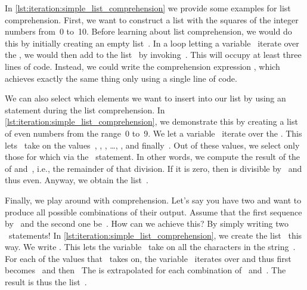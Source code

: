 %
In \cref{lst:iteration:simple_list_comprehension} we provide some examples for list comprehension.
First, we want to construct a list with the squares of the integer numbers from~0 to~10.
Before learning about list comprehension, we would do this by initially creating an empty list~.
In a  loop letting a variable~ iterate over the , we would then add  to the list~ by invoking~.
This will occupy at least three lines of code.
Instead, we could write the comprehension expression , which achieves exactly the same thing only using a single line of code.

We can also select which elements we want to insert into our list by using an  statement during the list comprehension.
In \cref{lst:iteration:simple_list_comprehension}, we demonstrate this by creating a list of even numbers from the range~0 to~9.
We let a variable~ iterate over the .
This lets~ take on the values~, , , \dots, , and finally~.
Out of these values, we select only those for which  via the ~statement.
In other words, we compute the result of the  of  and~, i.e., the remainder of that division.
If it is zero, then  is divisible by~ and thus even.
Anyway, we obtain the list~\pythonil{[0, 2, 4, 6, 8]}.%
%
\begin{sloppypar}%
Finally, we play around with  comprehension.
Let's say you have two  and want to produce all possible combinations of their output.
Assume that the first sequence by~ and the second one be~.
How can we achieve this?
By simply writing two ~statements!
In \cref{lst:iteration:simple_list_comprehension}, we create the list~ this way.
We write .
This lets the variable~ take on all the characters in the string~.
For each of the values that~ takes on, the variable~ iterates over  and thus first becomes~ and then~
The   is extrapolated for each combination of~ and~.
The result is thus the list~\pythonil{["ax", "ay", "bx", "by", "cx", "cy"]}.%
\end{sloppypar}%
